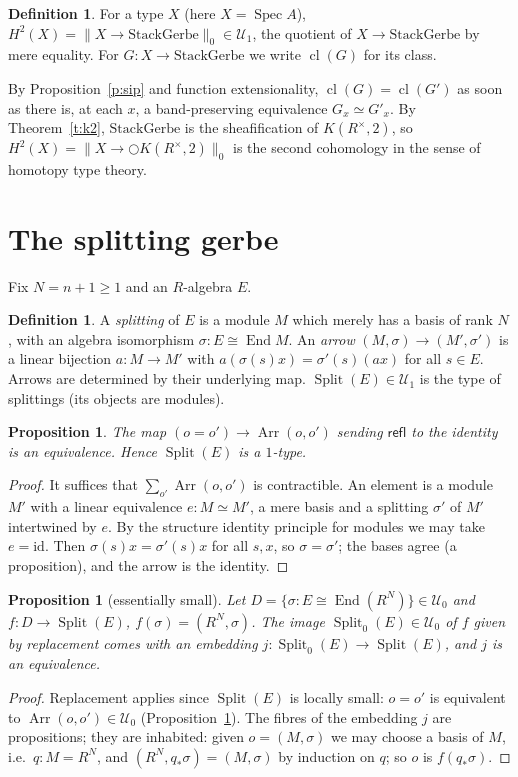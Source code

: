\documentclass[11pt]{amsart}
\newtheorem{proposition}[theorem]{Proposition}
\theoremstyle{definition}
\newtheorem{definition}[theorem]{Definition}
\theoremstyle{remark}
\newcommand{\Spec}{\operatorname{Spec}}
\newcommand{\End}{\operatorname{End}}
\newcommand{\Arr}{\operatorname{Arr}}
\newcommand{\Split}{\operatorname{Split}}
\newcommand{\cl}{\operatorname{cl}}
\newcommand{\trz}[1]{\|#1\|_0}
\newcommand{\Rx}{R^\times}
\newcommand{\U}{\mathcal U}
\begin{document}
\begin{definition}
For a type $X$ (here $X=\Spec A$), $H^2(X)=\trz{X\to\mathrm{StackGerbe}}\in\U_1$,
the quotient of $X\to\mathrm{StackGerbe}$ by mere equality. For
$G:X\to\mathrm{StackGerbe}$ we write $\cl(G)$ for its class.
\end{definition}

By Proposition~\ref{p:sip} and function extensionality, $\cl(G)=\cl(G')$ as
soon as there is, at each $x$, a band-preserving equivalence $G_x\simeq
G'_x$. By Theorem~\ref{t:k2}, $\mathrm{StackGerbe}$ is the
sheafification of $K(\Rx,2)$, so $H^2(X)=\trz{X\to\bigcirc K(\Rx,2)}$ is
the second cohomology in the sense of homotopy type theory.

\section{The splitting gerbe}

Fix $N=n+1\geq1$ and an $R$-algebra $E$.

\begin{definition}
A \emph{splitting} of $E$ is a module $M$ which merely has a basis of rank
$N$, with an algebra isomorphism $\sigma:E\cong\End M$. An \emph{arrow}
$(M,\sigma)\to(M',\sigma')$ is a linear bijection $a:M\to M'$ with
$a(\sigma(s)x)=\sigma'(s)(a x)$ for all $s\in E$. Arrows are determined by
their underlying map. $\Split(E)\in\U_1$ is the type of splittings (its objects are modules).
\end{definition}

\begin{proposition}\label{p:paths}
The map $(o=o')\to\Arr(o,o')$ sending $\mathsf{refl}$ to the identity is an
equivalence. Hence $\Split(E)$ is a $1$-type.
\end{proposition}
\begin{proof}
It suffices that $\sum_{o'}\Arr(o,o')$ is contractible. An element is a
module $M'$ with a linear equivalence $e:M\simeq M'$, a mere basis and a
splitting $\sigma'$ of $M'$ intertwined by $e$. By the structure identity
principle for modules we may take $e=\mathrm{id}$. Then
$\sigma(s)x=\sigma'(s)x$ for all $s,x$, so $\sigma=\sigma'$; the bases
agree (a proposition), and the arrow is the identity.
\end{proof}

\begin{proposition}[essentially small]\label{p:small}
Let $D=\{\sigma: E\cong\End(R^N)\}\in\U_0$ and $f:D\to\Split(E)$,
$f(\sigma)=(R^N,\sigma)$. The image $\Split_0(E)\in\U_0$ of $f$ given by
replacement comes with an embedding $j:\Split_0(E)\to\Split(E)$, and $j$ is
an equivalence.
\end{proposition}
\begin{proof}
Replacement applies since $\Split(E)$ is locally small: $o=o'$ is
equivalent to $\Arr(o,o')\in\U_0$ (Proposition~\ref{p:paths}). The fibres
of the embedding $j$ are propositions; they are inhabited: given
$o=(M,\sigma)$ we may choose a basis of $M$, i.e.\ $q:M=R^N$, and
$(R^N,q_*\sigma)=(M,\sigma)$ by induction on $q$; so $o$ is $f(q_*\sigma)$.
\end{proof}
\end{document}
